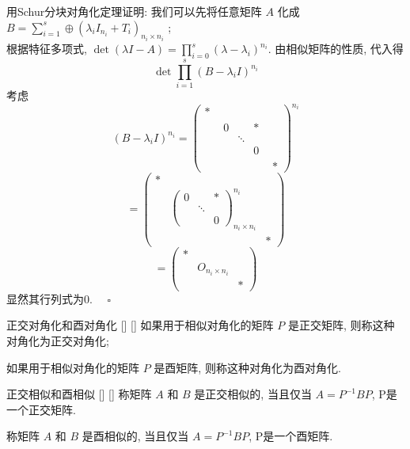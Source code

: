 \documentclass[UTF8]{ctexart}
\DeclareMathOperator{\0}{\mathbf{0}}
\DeclareMathOperator{\<}{\langle}
\renewcommand{\>}{\rangle}
\begin{document}
		\begin{prf}
			用Schur分块对角化定理证明: 我们可以先将任意矩阵 \(A\) 化成 \(B=\sum_{i=1}^{s}\oplus (\lambda_iI_{n_i}+T_i)_{n_i\times n_i}\) ;\\
			根据特征多项式,  \(\det(\lambda I-A)=\prod_{i=0}^{s}(\lambda-\lambda_i)^{n_i}\). 由相似矩阵的性质, 
			代入得\begin{displaymath}
				\det\prod_{i=1}^{s}\left(B-\lambda_iI\right)^{n_i} 
			\end{displaymath}
			考虑\[
				\left(B-\lambda_iI\right)^{n_i}=\begin{pmatrix}
					*&&\\ &\begin{matrix}
						0&&*\\ &\ddots&\\ &&0
					\end{matrix}&\\ &&*
				\end{pmatrix}^{n_i}\]
				\[=\begin{pmatrix}
					*&&\\ &\begin{pmatrix}
						0&&*\\ &\ddots&\\ &&0
					\end{pmatrix}^{n_i}_{n_i\times n_i}&\\ &&*
				\end{pmatrix}\]
                \[=\begin{pmatrix}
					*&&\\ &O_{n_i\times n_i}&\\ &&*
				\end{pmatrix}
			\]
			显然其行列式为0. \(\quad\square\) 
		\end{prf}

		\begin{dfn}
			[]
			{正交对角化和酉对角化}
			[]
			[]
			如果用于相似对角化的矩阵 \(P\) 是正交矩阵, 则称这种对角化为正交对角化; 

			如果用于相似对角化的矩阵 \(P\) 是酉矩阵, 则称这种对角化为酉对角化.
		\end{dfn}
		
		\begin{dfn}
			[]
			{正交相似和酉相似}
			[]
			[]
			称矩阵 \(A\) 和 \(B\) 是正交相似的, 当且仅当 \(A=P^{-1}BP\), P是一个正交矩阵.

			称矩阵 \(A\) 和 \(B\) 是酉相似的, 当且仅当 \(A=P^{-1}BP\), P是一个酉矩阵.
		\end{dfn}
\end{document}
